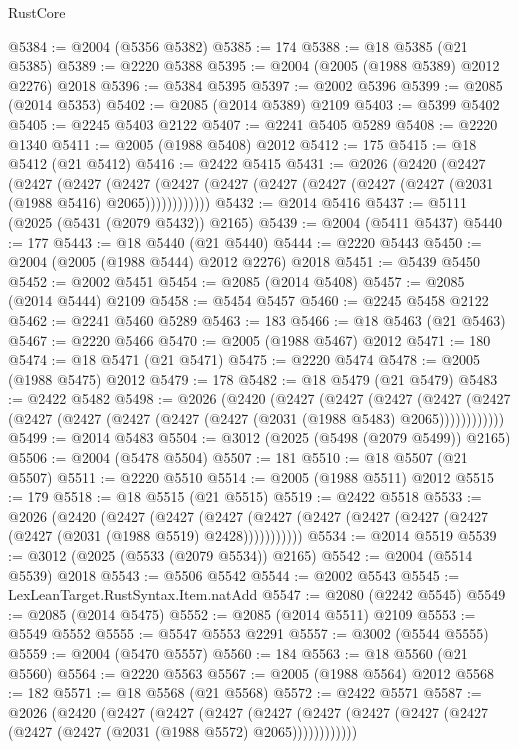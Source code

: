 \begin{lexlean}{RustCore}
\begin{coremodule}
@5384 := @2004 (@5356 @5382)
@5385 := 174
@5388 := @18 @5385 (@21 @5385)
@5389 := @2220 @5388
@5395 := @2004 (@2005 (@1988 @5389) @2012 @2276) @2018
@5396 := @5384 @5395
@5397 := @2002 @5396
@5399 := @2085 (@2014 @5353)
@5402 := @2085 (@2014 @5389) @2109
@5403 := @5399 @5402
@5405 := @2245 @5403 @2122
@5407 := @2241 @5405 @5289
@5408 := @2220 @1340
@5411 := @2005 (@1988 @5408) @2012
@5412 := 175
@5415 := @18 @5412 (@21 @5412)
@5416 := @2422 @5415
@5431 := @2026
    (@2420
      (@2427
        (@2427
          (@2427
            (@2427 (@2427 (@2427 (@2427 (@2427 (@2427 (@2427 (@2031 (@1988 @5416) @2065))))))))))))
@5432 := @2014 @5416
@5437 := @5111 (@2025 (@5431 (@2079 @5432)) @2165)
@5439 := @2004 (@5411 @5437)
@5440 := 177
@5443 := @18 @5440 (@21 @5440)
@5444 := @2220 @5443
@5450 := @2004 (@2005 (@1988 @5444) @2012 @2276) @2018
@5451 := @5439 @5450
@5452 := @2002 @5451
@5454 := @2085 (@2014 @5408)
@5457 := @2085 (@2014 @5444) @2109
@5458 := @5454 @5457
@5460 := @2245 @5458 @2122
@5462 := @2241 @5460 @5289
@5463 := 183
@5466 := @18 @5463 (@21 @5463)
@5467 := @2220 @5466
@5470 := @2005 (@1988 @5467) @2012
@5471 := 180
@5474 := @18 @5471 (@21 @5471)
@5475 := @2220 @5474
@5478 := @2005 (@1988 @5475) @2012
@5479 := 178
@5482 := @18 @5479 (@21 @5479)
@5483 := @2422 @5482
@5498 := @2026
    (@2420
      (@2427
        (@2427
          (@2427
            (@2427 (@2427 (@2427 (@2427 (@2427 (@2427 (@2427 (@2031 (@1988 @5483) @2065))))))))))))
@5499 := @2014 @5483
@5504 := @3012 (@2025 (@5498 (@2079 @5499)) @2165)
@5506 := @2004 (@5478 @5504)
@5507 := 181
@5510 := @18 @5507 (@21 @5507)
@5511 := @2220 @5510
@5514 := @2005 (@1988 @5511) @2012
@5515 := 179
@5518 := @18 @5515 (@21 @5515)
@5519 := @2422 @5518
@5533 := @2026
    (@2420
      (@2427
        (@2427
          (@2427 (@2427 (@2427 (@2427 (@2427 (@2427 (@2427 (@2031 (@1988 @5519) @2428)))))))))))
@5534 := @2014 @5519
@5539 := @3012 (@2025 (@5533 (@2079 @5534)) @2165)
@5542 := @2004 (@5514 @5539) @2018
@5543 := @5506 @5542
@5544 := @2002 @5543
@5545 := LexLeanTarget.RustSyntax.Item.natAdd
@5547 := @2080 (@2242 @5545)
@5549 := @2085 (@2014 @5475)
@5552 := @2085 (@2014 @5511) @2109
@5553 := @5549 @5552
@5555 := @5547 @5553 @2291
@5557 := @3002 (@5544 @5555)
@5559 := @2004 (@5470 @5557)
@5560 := 184
@5563 := @18 @5560 (@21 @5560)
@5564 := @2220 @5563
@5567 := @2005 (@1988 @5564) @2012
@5568 := 182
@5571 := @18 @5568 (@21 @5568)
@5572 := @2422 @5571
@5587 := @2026
    (@2420
      (@2427
        (@2427
          (@2427
            (@2427 (@2427 (@2427 (@2427 (@2427 (@2427 (@2427 (@2031 (@1988 @5572) @2065))))))))))))

\end{coremodule}
\end{lexlean}
